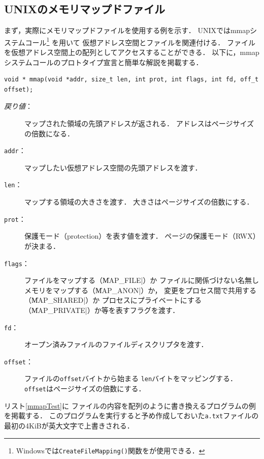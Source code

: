 \subsection{UNIXのメモリマップドファイル}
まず，実際にメモリマップドファイルを使用する例を示す．
UNIXではmmapシステムコール\footnote{
Windowsでは\texttt{CreateFileMapping()}関数をが使用できる．} を用いて
仮想アドレス空間とファイルを関連付ける．
ファイルを仮想アドレス空間上の配列としてアクセスすることができる．
以下に，mmapシステムコールのプロトタイプ宣言と簡単な解説を掲載する．

\begin{lstlisting}[numbers=none]
void * mmap(void *addr, size_t len, int prot, int flags, int fd, off_t offset);
\end{lstlisting}

\begin{description}
\item[\emph{戻り値}：]
  マップされた領域の先頭アドレスが返される．
  アドレスはページサイズの倍数になる．
\item[\texttt{addr}：]
  マップしたい仮想アドレス空間の先頭アドレスを渡す．
\item[\texttt{len}：]
  マップする領域の大きさを渡す．
  大きさはページサイズの倍数にする．
\item[\texttt{prot}：]
  保護モード（protection）を表す値を渡す．
  ページの保護モード（RWX）が決まる．
\item[\texttt{flags}：]
  ファイルをマップする（\|MAP_FILE|）か
  ファイルに関係づけない名無しメモリをマップする（\|MAP_ANON|）か，
  変更をプロセス間で共用する（\|MAP_SHARED|）か
  プロセスにプライベートにする（\|MAP_PRIVATE|）か等を表すフラグを渡す．
\item[\texttt{fd}：]
  オープン済みファイルのファイルディスクリプタを渡す．
\item[\texttt{offset}：]
  ファイルの\texttt{offset}バイトから始まる
  \texttt{len}バイトをマッピングする．
  \texttt{offset}はページサイズの倍数にする．
\end{description}

リスト\ref{mmapTest}に
ファイルの内容を配列のように書き換えるプログラムの例を掲載する．
このプログラムを実行すると予め作成しておいた\texttt{a.txt}ファイルの
最初の4KiBが英大文字で上書きされる．



